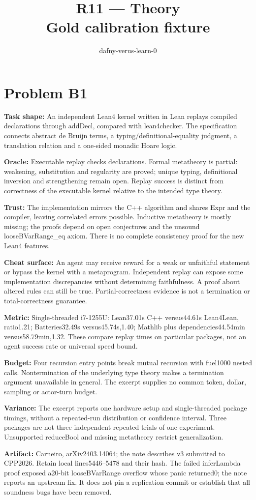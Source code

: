 \documentclass[11pt]{article}
\title{R11 --- Theory \\ \large Gold calibration fixture}
\author{dafny-verus-learn-0}
\date{}
\begin{document}
\maketitle
\section*{Problem B1}\label{ans:B1}
\begin{answer}
\textbf{Task shape:} An independent Lean4 kernel written in Lean replays compiled declarations through addDecl, compared with lean4checker. The specification connects abstract de Bruijn terms, a typing/definitional-equality judgment, a translation relation and a one-sided monadic Hoare logic.

\textbf{Oracle:} Executable replay checks declarations. Formal metatheory is partial: weakening, substitution and regularity are proved; unique typing, definitional inversion and strengthening remain open. Replay success is distinct from correctness of the executable kernel relative to the intended type theory.

\textbf{Trust:} The implementation mirrors the C++ algorithm and shares Expr and the compiler, leaving correlated errors possible. Inductive metatheory is mostly missing; the proofs depend on open conjectures and the unsound looseBVarRange\_eq axiom. There is no complete consistency proof for the new Lean4 features.

\textbf{Cheat surface:} An agent may receive reward for a weak or unfaithful statement or bypass the kernel with a metaprogram. Independent replay can expose some implementation discrepancies without determining faithfulness. A proof about altered rules can still be true. Partial-correctness evidence is not a termination or total-correctness guarantee.

\textbf{Metric:} Single-threaded i7-1255U: Lean37.01s C++ versus44.61s Lean4Lean, ratio1.21; Batteries32.49s versus45.74s,1.40; Mathlib plus dependencies44.54min versus58.79min,1.32. These compare replay times on particular packages, not an agent success rate or universal speed bound.

\textbf{Budget:} Four recursion entry points break mutual recursion with fuel1000 nested calls. Nontermination of the underlying type theory makes a termination argument unavailable in general. The excerpt supplies no common token, dollar, sampling or actor-turn budget.

\textbf{Variance:} The excerpt reports one hardware setup and single-threaded package timings, without a repeated-run distribution or confidence interval. Three packages are not three independent repeated trials of one experiment. Unsupported reduceBool and missing metatheory restrict generalization.

\textbf{Artifact:} Carneiro, arXiv2403.14064; the note describes v3 submitted to CPP2026. Retain local lines5446--5478 and their hash. The failed inferLambda proof exposed a20-bit looseBVarRange overflow whose panic returned0; the note reports an upstream fix. It does not pin a replication commit or establish that all soundness bugs have been removed.
\end{answer}
\end{document}
